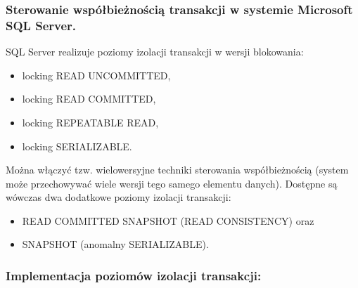 \documentclass[main.tex]{subfiles}
\begin{document}
    \subsubsection{Sterowanie współbieżnością transakcji w systemie Microsoft SQL Server.}
    SQL Server realizuje poziomy izolacji transakcji w wersji blokowania:
    \begin{itemize}
        \item locking READ UNCOMMITTED,
        \item locking READ COMMITTED,
        \item locking REPEATABLE READ,
        \item locking SERIALIZABLE.
    \end{itemize}

    Można włączyć tzw. wielowersyjne techniki sterowania współbieżnością (system może
    przechowywać wiele wersji tego samego elementu danych). Dostępne są wówczas dwa
    dodatkowe poziomy izolacji transakcji:
    \begin{itemize}
        \item READ COMMITTED SNAPSHOT (READ CONSISTENCY) oraz
        \item SNAPSHOT (anomalny SERIALIZABLE).
    \end{itemize}

    \subsubsection{Implementacja poziomów izolacji transakcji:}
\end{document}

